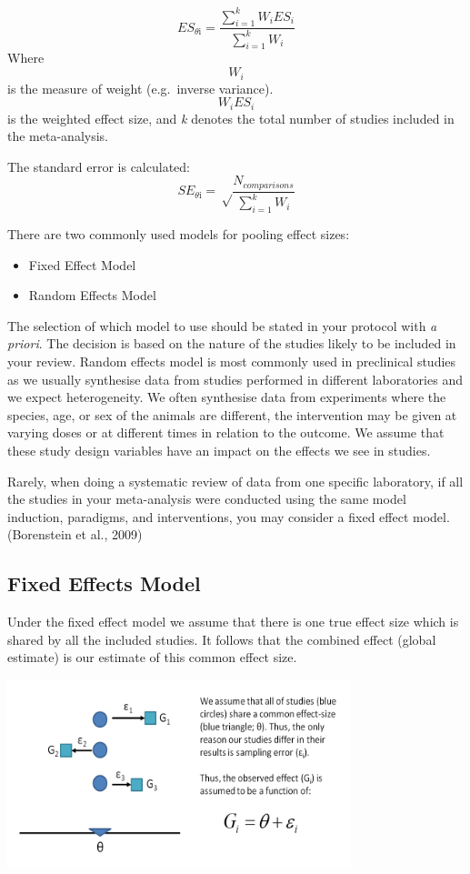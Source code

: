 \documentclass[
]{book}
\providecommand{\tightlist}{%
  \setlength{\itemsep}{0pt}\setlength{\parskip}{0pt}}
\begin{document}
\[ES_{\theta\text{i}} = \frac{\sum_{i=1}^{k} W_iES_i}{\sum_{i=1}^{k} W_i} \]
Where \[W_i\] is the measure of weight (e.g.~inverse variance). \[W_iES_i \] is the weighted effect size, and \emph{k} denotes the total number of studies included in the meta-analysis.

The standard error is calculated:
\[SE_{\theta\text{i}} = \sqrt \frac{N_{comparisons}}{\sum_{i=1}^{k} W_i} \]

There are two commonly used models for pooling effect sizes:

\begin{itemize}
\tightlist
\item
  Fixed Effect Model
\item
  Random Effects Model
\end{itemize}

The selection of which model to use should be stated in your protocol with \emph{a priori}. The decision is based on the nature of the studies likely to be included in your review. Random effects model is most commonly used in preclinical studies as we usually synthesise data from studies performed in different laboratories and we expect heterogeneity. We often synthesise data from experiments where the species, age, or sex of the animals are different, the intervention may be given at varying doses or at different times in relation to the outcome. We assume that these study design variables have an impact on the effects we see in studies.

Rarely, when doing a systematic review of data from one specific laboratory, if all the studies in your meta-analysis were conducted using the same model induction, paradigms, and interventions, you may consider a fixed effect model. (Borenstein et al., 2009)

\hypertarget{fixed-effects-model}{%
\subsection{Fixed Effects Model}\label{fixed-effects-model}}

Under the fixed effect model we assume that there is one true effect size which is shared by all the included studies. It follows that the combined effect (global estimate) is our estimate of this common effect size.

\includegraphics[width=0.75\textwidth,height=\textheight]{figs/fixedeffects.png}
\end{document}
